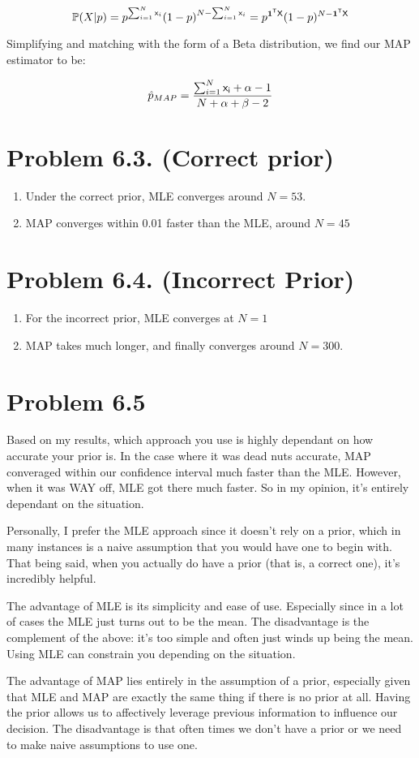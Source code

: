\documentclass{article}
\begin{document}
\[ \mathbb{P}(X|p) = p^{\sum_{i=1}^{N} {\sf{x}}_i} (1 - p)^{N - \sum_{i=1}^{N} {\sf{x}}_i} =  p^{\textbf{1}^{{\sf{T}}}{\sf{X}}} (1 - p)^{N-\textbf{1}^{{\sf{T}}}{\sf{X}}} \]

Simplifying and matching with the form of a Beta distribution, we find our MAP estimator to be:

\[ \hat{p}_{MAP} = \frac{\sum_{i=1}^{N} {\sf{x}_i} + \alpha - 1}{N + \alpha + \beta - 2} \]

\section*{Problem 6.3. (Correct prior)}
  \begin{enumerate}[label=(\alph*)]
    \item Under the correct prior, MLE converges around $N = 53$.
    \item MAP converges within 0.01 faster than the MLE, around $N = 45$ 
  \end{enumerate}

\section*{Problem 6.4. (Incorrect Prior)}

\begin{enumerate}[label=(\alph*)]
  \item For the incorrect prior, MLE converges at $N = 1$ 
  \item MAP takes much longer, and finally converges around $N = 300$.
\end{enumerate}

\section*{Problem 6.5}
Based on my results, which approach you use is highly dependant on how accurate your prior is. In the case where it was dead nuts accurate, MAP converaged within our confidence interval much faster than the MLE. However, when it was WAY off, MLE got there much faster. So in my opinion, it's entirely dependant on the situation.

Personally, I prefer the MLE approach since it doesn't rely on a prior, which in many instances is a naive assumption that you would have one to begin with. That being said, when you actually do have a prior (that is, a correct one), it's incredibly helpful.

The advantage of MLE is its simplicity and ease of use. Especially since in a lot of cases the MLE just turns out to be the mean. The disadvantage is the complement of the above: it's too simple and often just winds up being the mean. Using MLE can constrain you depending on the situation.

The advantage of MAP lies entirely in the assumption of a prior, especially given that MLE and MAP are exactly the same thing if there is no prior at all. Having the prior allows us to affectively leverage previous information to influence our decision. The disadvantage is that often times we don't have a prior or we need to make naive assumptions to use one.
\end{document}
